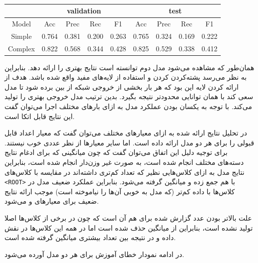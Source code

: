 \documentclass[12pt, a4paper]{article}
\begin{document}
\begin{latin}
    \begin{table}[h]
        \centering
        \caption{}
        \label{complex_vs_simple}
        \begin{tabular}{c|c|c|c|c|c|c|c|c}
                    & \multicolumn{4}{c|}{validation} & \multicolumn{4}{c}{test} \\
            \hline
            Model & Acc & Prec & Rec & F1 & Acc & Prec & Rec & F1 \\
            \hline
            Simple & 0.764 & 0.381 & 0.200 &  0.263 & 0.765 & 0.324 & 0.169 & 0.222 \\
            Complex & 0.822 & 0.568 & 0.344 & 0.428 & 0.825 & 0.529 & 0.338 & 0.412
        \end{tabular}
    \end{table}
\end{latin}

همان‌طور که مشاهده می‌شود مدل دوم توانسته‌ است نتایج بهتری را ارائه دهد. بنابراین
به نظر می‌رسد پشته‌کردن کردن و استفاده از لایه‌های  مفید واقع شده باشد.
هدف از ارائه کردن لایه  این بود که هر بار بخشی از خروجی شبکه
از بین برده شود تا مدل سعی کند با همان توانایی محدود‌تر نتیجه بگیرد. بدین ترتیب
مدل خروجی بهتری را تولید می‌کند. با توجه به یکسان بودن عملکرد مدل به ازای
بار‌های مختلف اجرا می‌توان گفت این نتایج قابل اتکا است.

در تحلیل نتایج ارائه شده به ازای معیار‌های مختلف می‌توان گفت که معیار  اعداد قابل
قبولی را برای هر دو مدل ارائه داده است. اما سایر معیار‌ها از نظر عددی خوب نیستند. برای توجیه دلیل این
اتفاق می‌توان گفت که چون میانگینی که برای ادغام نتایج دسته‌های مختلف انجام شده است، به صورت غیر وزن‌دار
انجام شده است، بنابراین نتایج مدل به ازای کلاس‌هایی نظیر  که تعداد کم‌تری داشته‌اند
در مقایسه با کلاس‌های \texttt{<ROOT>} با هم جمع زده و میانگین گرفته می‌شود. بنابراین عملکرد ضعیف مدل
در کلاس‌ها با داده کم‌تر (که مدل به خوبی آن‌ها را نیاموخته است) موجب ارائه نتایج ضعیف برای معیار‌های
 و  می‌شود.

علت بالاتر بودن عدد گزارش‌ شده برای  هم آن است که چون در  برخی از کلاس‌ها
اصلا تولید نشده است، بنابراین از میانگین حذف شده است اما در  همه این کلاس‌ها در
نقش داده و در نتیجه بین تعداد بیشتری میانگین گرفته شده است.

در ادامه نمودار
خطای آموزش برای هر دو مدل آورده می‌شود.
\end{document}
